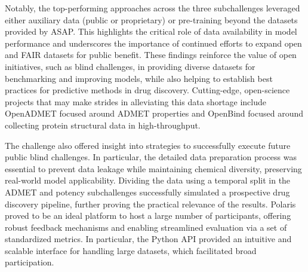 \documentclass[journal=jcim,manuscript=article]{achemso}
\begin{document}
{Notably, the top-performing approaches across the three subchallenges leveraged either auxiliary data (public or proprietary) or pre-training beyond the datasets provided by ASAP. This highlights the critical role of data availability in model performance and underscores the importance of continued efforts to expand open and FAIR\cite{wilkinson_fair_2016} datasets for public benefit. These findings reinforce the value of open initiatives, such as blind challenges, in providing diverse datasets for benchmarking and improving models, while also helping to establish best practices for predictive methods in drug discovery. Cutting-edge, open-science projects that may make strides in alleviating this data shortage include OpenADMET focused around ADMET properties and OpenBind\cite{openbind_2025} focused around collecting protein structural data in high-throughput.

The challenge also offered insight into strategies to successfully execute future public blind challenges. In particular, the detailed data preparation process was essential to prevent data leakage while maintaining chemical diversity, preserving real-world model applicability. Dividing the data using a temporal split in the ADMET and potency subchallenges successfully simulated a prospective drug discovery pipeline, further proving the practical relevance of the results.
Polaris proved to be an ideal platform to host a large number of participants, offering robust feedback mechanisms and enabling streamlined evaluation via a set of standardized metrics. In particular, the Python API provided an intuitive and scalable interface for handling large datasets, which facilitated broad participation. 



}
\end{document}
